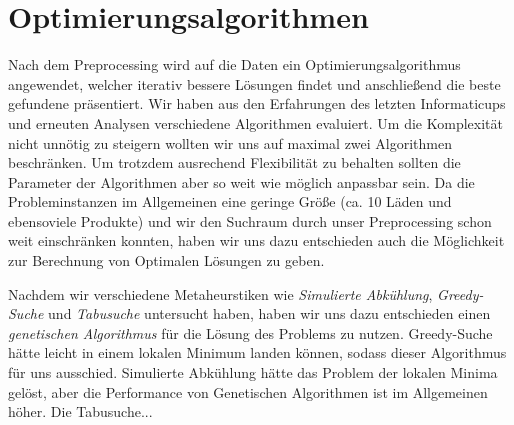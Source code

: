 \section{Optimierungsalgorithmen}

Nach dem Preprocessing wird auf die Daten ein Optimierungsalgorithmus angewendet, welcher iterativ bessere Lösungen findet und anschließend die beste gefundene präsentiert. Wir haben aus den Erfahrungen des letzten Informaticups und erneuten Analysen verschiedene Algorithmen evaluiert. Um die Komplexität nicht unnötig zu steigern wollten wir uns auf maximal zwei Algorithmen beschränken. Um trotzdem ausrechend Flexibilität zu behalten sollten die Parameter der Algorithmen aber so weit wie möglich anpassbar sein. Da die Probleminstanzen im Allgemeinen eine geringe Größe (ca. 10 Läden und ebensoviele Produkte) und wir den Suchraum durch unser Preprocessing schon weit einschränken konnten, haben wir uns dazu entschieden auch die Möglichkeit zur Berechnung von Optimalen Lösungen zu geben. 

Nachdem wir verschiedene Metaheurstiken wie \emph{Simulierte Abkühlung}, \emph{Greedy-Suche} und \emph{Tabusuche} untersucht haben, haben wir uns dazu entschieden einen \emph{genetischen Algorithmus} für die Lösung des Problems zu nutzen. Greedy-Suche hätte leicht in einem lokalen Minimum landen können, sodass dieser Algorithmus für uns ausschied. Simulierte Abkühlung hätte das Problem der lokalen Minima gelöst, aber die Performance von Genetischen Algorithmen ist im Allgemeinen höher. Die Tabusuche...



